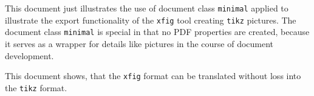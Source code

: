 \documentclass{minimal}
\begin{document}
This document just illustrates the use of document class \texttt{minimal} 
applied to illustrate the export functionality of the \texttt{xfig} tool 
creating \texttt{tikz} pictures. 
The document class \texttt{minimal} is special in that no PDF properties are created, 
because it serves as a wrapper for details like pictures in the course of document development. 

This document shows, that the \texttt{xfig} format 
can be translated without loss into the \texttt{tikz} format. 

\begin{center}
\resizebox{0.5\textwidth}{!}{}
\end{center}
\end{document}
